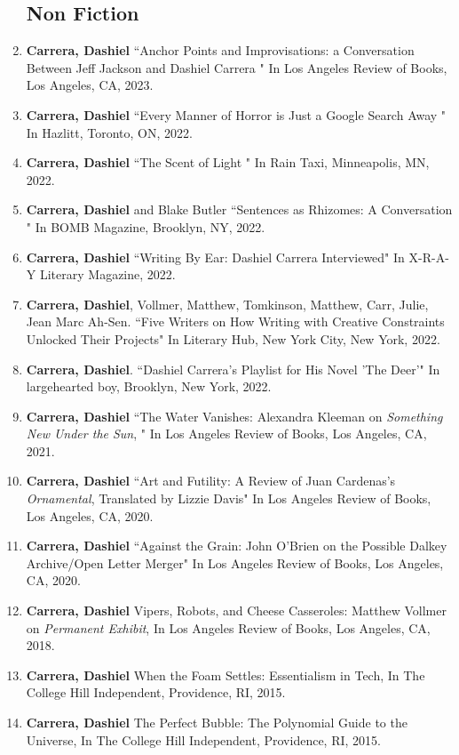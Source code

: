 \begin{enumerate}
\subsection{Non Fiction}
\item \textbf{Carrera, Dashiel} ``Anchor Points and Improvisations: a Conversation Between Jeff Jackson and Dashiel Carrera " In Los Angeles Review of Books, Los Angeles, CA, 2023.\\
\item \textbf{Carrera, Dashiel} ``Every Manner of Horror is Just a Google Search Away " In Hazlitt, Toronto, ON, 2022.\\
\item \textbf{Carrera, Dashiel} ``The Scent of Light " In Rain Taxi, Minneapolis, MN, 2022.\\
\item \textbf{Carrera, Dashiel} and Blake Butler ``Sentences as Rhizomes: A Conversation " In BOMB Magazine, Brooklyn, NY, 2022.\\
\item \textbf{Carrera, Dashiel}  ``Writing By Ear: Dashiel Carrera Interviewed" In X-R-A-Y Literary Magazine, 2022.\\
\item \textbf{Carrera, Dashiel}, Vollmer, Matthew, Tomkinson, Matthew, Carr, Julie, Jean Marc Ah-Sen. ``Five Writers on How Writing with Creative Constraints Unlocked Their Projects" In Literary Hub, New York City, New York, 2022.\\
\item \textbf{Carrera, Dashiel}. ``Dashiel Carrera's Playlist for His Novel 'The Deer'" In largehearted boy, Brooklyn, New York, 2022.\\




\item \textbf{Carrera, Dashiel} ``The Water Vanishes: Alexandra Kleeman on \textit{Something New Under the Sun}, " In Los Angeles Review of Books, Los Angeles, CA, 2021.\\
\item \textbf{Carrera, Dashiel} ``Art and Futility: A Review of Juan Cardenas's \textit{Ornamental}, Translated by Lizzie Davis" In Los Angeles Review of Books, Los Angeles, CA, 2020.\\
\item \textbf{Carrera, Dashiel} ``Against the Grain: John O'Brien on the Possible Dalkey Archive/Open Letter Merger" In Los Angeles Review of Books, Los Angeles, CA, 2020. \\
\item \textbf{Carrera, Dashiel} Vipers, Robots, and Cheese Casseroles: Matthew Vollmer on \textit{Permanent Exhibit}, In Los Angeles Review of Books, Los Angeles, CA, 2018.\\
\item \textbf{Carrera, Dashiel} When the Foam Settles: Essentialism in Tech, In The College Hill Independent, Providence, RI, 2015.\\
\item \textbf{Carrera, Dashiel} The Perfect Bubble: The Polynomial Guide to the Universe, In The College Hill Independent, Providence, RI, 2015.\\


\end{enumerate}
